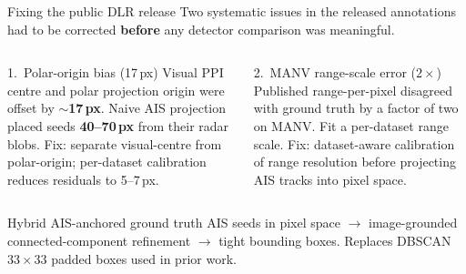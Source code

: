 \documentclass[aspectratio=169,10pt]{beamer}
\newcommand{\hl}[1]{\textcolor{garnet}{\textbf{#1}}}
\newcommand{\sub}[1]{{\footnotesize\textcolor{black70}{#1}}}
\begin{document}
\begin{frame}{Fixing the public DLR release}
  Two systematic issues in the released annotations had to be corrected
  \textbf{before} any detector comparison was meaningful.
  \vspace{0.6em}
  \begin{columns}[T,onlytextwidth]
      \begin{block}{1.\ Polar-origin bias (17\,px)}
        Visual PPI centre and polar projection origin were offset by
        \hl{$\sim$17\,px}.  Naive AIS projection placed seeds
        \hl{40--70\,px} from their radar blobs.
        \sub{Fix: separate visual-centre from polar-origin; per-dataset calibration
        reduces residuals to 5--7\,px.}
      \end{block}
      \begin{block}{2.\ MANV range-scale error ($2\times$)}
        Published range-per-pixel disagreed with ground truth by a
        factor of two on MANV.  Fit a per-dataset range scale.
        \sub{Fix: dataset-aware calibration of range resolution before projecting AIS tracks into pixel space.}
      \end{block}
  \end{columns}
  \vspace{0.5em}
  \begin{block}{Hybrid AIS-anchored ground truth}
    AIS seeds in pixel space $\rightarrow$ image-grounded connected-component
    refinement $\rightarrow$ tight bounding boxes.  Replaces DBSCAN
    $33\times33$ padded boxes used in prior work.
  \end{block}
\end{frame}
\end{document}
